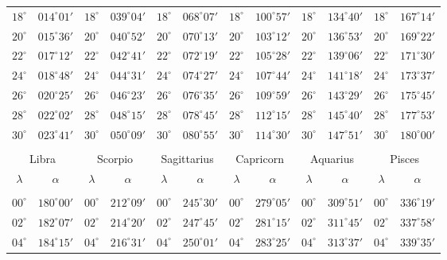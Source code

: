\begin{table}[!h]
{\begin{tabular}{cc|cc|cc|cc|cc|cc}
$18^\circ$ & $014^\circ01'$ & $18^\circ$ & $039^\circ04'$ & $18^\circ$ & $068^\circ07'$ & $18^\circ$ & $100^\circ57'$ & $18^\circ$ & $134^\circ40'$ & $18^\circ$ & $167^\circ14'$\\
$20^\circ$ & $015^\circ36'$ & $20^\circ$ & $040^\circ52'$ & $20^\circ$ & $070^\circ13'$ & $20^\circ$ & $103^\circ12'$ & $20^\circ$ & $136^\circ53'$ & $20^\circ$ & $169^\circ22'$\\
$22^\circ$ & $017^\circ12'$ & $22^\circ$ & $042^\circ41'$ & $22^\circ$ & $072^\circ19'$ & $22^\circ$ & $105^\circ28'$ & $22^\circ$ & $139^\circ06'$ & $22^\circ$ & $171^\circ30'$\\
$24^\circ$ & $018^\circ48'$ & $24^\circ$ & $044^\circ31'$ & $24^\circ$ & $074^\circ27'$ & $24^\circ$ & $107^\circ44'$ & $24^\circ$ & $141^\circ18'$ & $24^\circ$ & $173^\circ37'$\\
$26^\circ$ & $020^\circ25'$ & $26^\circ$ & $046^\circ23'$ & $26^\circ$ & $076^\circ35'$ & $26^\circ$ & $109^\circ59'$ & $26^\circ$ & $143^\circ29'$ & $26^\circ$ & $175^\circ45'$\\
$28^\circ$ & $022^\circ02'$ & $28^\circ$ & $048^\circ15'$ & $28^\circ$ & $078^\circ45'$ & $28^\circ$ & $112^\circ15'$ & $28^\circ$ & $145^\circ40'$ & $28^\circ$ & $177^\circ53'$\\
$30^\circ$ & $023^\circ41'$ & $30^\circ$ & $050^\circ09'$ & $30^\circ$ & $080^\circ55'$ & $30^\circ$ & $114^\circ30'$ & $30^\circ$ & $147^\circ51'$ & $30^\circ$ & $180^\circ00'$\\
\multicolumn{12}{c}{}\\
\multicolumn{2}{c}{Libra}\vline & \multicolumn{2}{c}{Scorpio} \vline& \multicolumn{2}{c}{Sagittarius} \vline& \multicolumn{2}{c}{Capricorn}\vline &
\multicolumn{2}{c}{Aquarius}\vline & \multicolumn{2}{c}{Pisces}\\\hline
$\lambda$& $\alpha$& $\lambda$& $\alpha$& $\lambda$& $\alpha$& $\lambda$& $\alpha$& $\lambda$& $\alpha$& $\lambda$& $\alpha$\\\hline
&&&&&&&&&&&\\[-2ex]
$00^\circ$ & $180^\circ00'$ & $00^\circ$ & $212^\circ09'$ & $00^\circ$ & $245^\circ30'$ & $00^\circ$ & $279^\circ05'$ &  $00^\circ$ & $309^\circ51'$ & $00^\circ$ & $336^\circ19'$\\
$02^\circ$ & $182^\circ07'$ & $02^\circ$ & $214^\circ20'$ & $02^\circ$ & $247^\circ45'$ & $02^\circ$ & $281^\circ15'$ &  $02^\circ$ & $311^\circ45'$ & $02^\circ$ & $337^\circ58'$\\
$04^\circ$ & $184^\circ15'$ & $04^\circ$ & $216^\circ31'$ & $04^\circ$ & $250^\circ01'$ & $04^\circ$ & $283^\circ25'$ &  $04^\circ$ & $313^\circ37'$ & $04^\circ$ & $339^\circ35'$\\

\end{tabular}}
\end{table}
